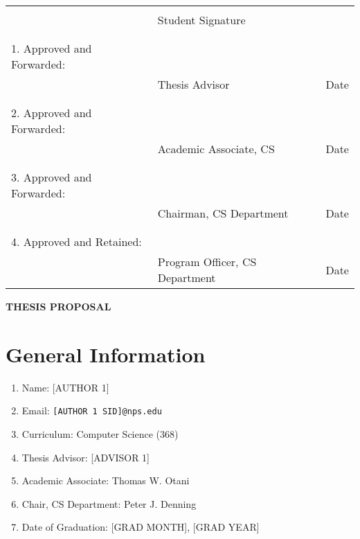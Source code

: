 \documentclass{article}
\begin{document}
\noindent
\newcommand{\sigspace}{\uline{\hspace{2in}}}
\newcommand{\datespace}{\uline{\hspace{.75in}}}

\begin{tabular}{lll}
\\
& \sigspace &  \\
& Student Signature & \\
\\
\\
1. Approved and Forwarded:  & \sigspace & \datespace \\
& Thesis Advisor & Date\\
\\
\\
2. Approved and Forwarded: & \sigspace & \datespace \\
& Academic Associate, CS & Date\\ 
\\
\\
3. Approved and Forwarded: & \sigspace & \datespace \\
& Chairman, CS Department & Date\\
\\
\\
4. Approved and Retained: & \sigspace & \datespace \\
& Program Officer, CS Department & Date\\
\end{tabular}
\newpage
\begin{center}
{\large\textbf{THESIS PROPOSAL}}
\end{center}

\def\thesection {\Alph{section}.}
\setlength{\parindent}{0pt} 
\setlength{\parskip}{2ex}

\section{General Information}

\begin{enumerate}
\item Name:  [AUTHOR 1]
\item Email:  \verb|[AUTHOR 1 SID]@nps.edu|
\item Curriculum:  Computer Science (368)
\item Thesis  Advisor: [ADVISOR 1]
\item Academic Associate:  Thomas W. Otani
\item Chair, CS Department: Peter J. Denning
\item Date of Graduation:  [GRAD MONTH], [GRAD YEAR] 
\end{enumerate}
\end{document}
